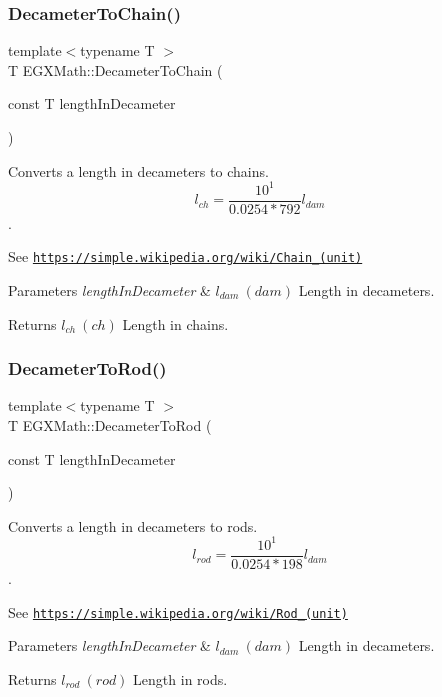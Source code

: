 \subsubsection{\texorpdfstring{Decameter\+To\+Chain()}{DecameterToChain()}}
{\footnotesize\ttfamily template$<$typename T $>$ \\
T E\+G\+X\+Math\+::\+Decameter\+To\+Chain (\begin{DoxyParamCaption}\item[{const T}]{length\+In\+Decameter }\end{DoxyParamCaption})}



Converts a length in decameters to chains. \[ l_{ch}= \frac{10^{1}}{0.0254 * 792} l_{dam} \]. 

See \href{https://simple.wikipedia.org/wiki/Chain_(unit)}{\tt https\+://simple.\+wikipedia.\+org/wiki/\+Chain\+\_\+(unit)} 
\begin{DoxyParams}{Parameters}
{\em length\+In\+Decameter} & $ l_{dam}\ (dam)$ Length in decameters. \\
\hline
\end{DoxyParams}
\begin{DoxyReturn}{Returns}
$ l_{ch}\ (ch)$ Length in chains. 
\end{DoxyReturn}
\mbox{\label{group___e_g_x_math-_conversions-_length_conversions-_decameter-_surveyors_ga0a6de708486617662fba474b67c8faa5}} 
\subsubsection{\texorpdfstring{Decameter\+To\+Rod()}{DecameterToRod()}}
{\footnotesize\ttfamily template$<$typename T $>$ \\
T E\+G\+X\+Math\+::\+Decameter\+To\+Rod (\begin{DoxyParamCaption}\item[{const T}]{length\+In\+Decameter }\end{DoxyParamCaption})}



Converts a length in decameters to rods. \[ l_{rod}= \frac{10^{1}}{0.0254 * 198} l_{dam} \]. 

See \href{https://simple.wikipedia.org/wiki/Rod_(unit)}{\tt https\+://simple.\+wikipedia.\+org/wiki/\+Rod\+\_\+(unit)} 
\begin{DoxyParams}{Parameters}
{\em length\+In\+Decameter} & $ l_{dam}\ (dam)$ Length in decameters. \\
\hline
\end{DoxyParams}
\begin{DoxyReturn}{Returns}
$ l_{rod}\ (rod)$ Length in rods. 
\end{DoxyReturn}
